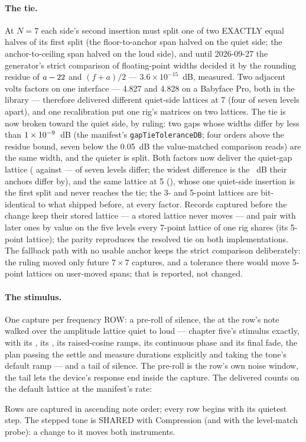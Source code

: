 \documentclass[11pt,a4paper]{article}
\begin{document}
\paragraph{The tie.} At $N = 7$ each side's second insertion must split
one of two EXACTLY equal halves of its first split (the floor-to-anchor
span halved on the quiet side; the anchor-to-ceiling span halved on the
loud side), and until 2026-09-27 the generator's strict comparison of
floating-point widths decided it by the rounding residue of
$a - 22$ and $(f + a)/2$ --- $3.6 \times 10^{-15}$~dB,
measured. Two adjacent volts factors on one interface --- 4.827 and 4.828
on a Babyface Pro, both in the library --- therefore delivered different
quiet-side lattices at 7 (four of seven levels apart), and one
recalibration put one rig's matrices on two lattices. The tie is now
broken toward the quiet side, by ruling: two gaps whose widths differ by
less than $1\times 10^{-9}$~dB (the manifest's
\texttt{gapTieToleranceDB}; four orders above the residue bound, seven
below the 0.05~dB the value-matched comparison reads) are the same width,
and the quieter is split. Both factors now deliver the quiet-gap lattice
(\mlatTieA{} against \mlatTieB{} --- \mlatTieDiffering{} of seven levels
differ; the widest difference is the \mlatTieAgreeDB{}~dB their anchors
differ by), and the same lattice at 5 (\mlatTieFive), whose one
quiet-side insertion is the first split and never reaches the tie; the
3- and 5-point lattices are bit-identical to what shipped before, at
every factor. Records captured before the change keep their stored
lattice --- a stored lattice never moves --- and pair with later ones by
value on the five levels every 7-point lattice of one rig shares (its
5-point lattice); the parity reproduces the resolved tie on both
implementations. The fallback path with no usable anchor keeps the strict
comparison deliberately: the ruling moved only future $7 \times 7$
captures, and a tolerance there would move 5-point lattices on user-moved
spans; that is reported, not changed.

\paragraph{The stimulus.} One capture per frequency ROW: a pre-roll of
silence, the  at the row's note walked over the
amplitude lattice quiet to loud --- chapter five's stimulus exactly, with
its , its , its raised-cosine ramps,
its continuous phase and its final fade, the plan passing the settle and
measure durations explicitly and taking the tone's default ramp --- and a
tail of silence. The pre-roll is the row's own noise window, the tail
lets the device's response end inside the capture. The delivered counts
on the default lattice at the manifest's rate:
\begin{center}\small\mlatRowTable\end{center}
Rows are captured in ascending note order; every row begins with its
quietest step. The stepped tone is SHARED with Compression (and
with the level-match probe): a change to it moves both instruments.
\end{document}
